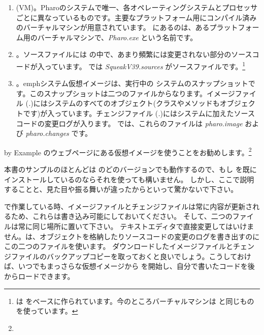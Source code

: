 \documentclass[a4paper,10pt,twoside]{book}
\begin{document}
\begin{enumerate}

  \item {} (VM)。Pharoのシステムで唯一、各オペレーティングシステムとプロセッサごとに異なっているものです。主要なプラットフォーム用にコンパイル済みのバーチャルマシンが用意されています。 にあるのは、あるプラットフォーム用のバーチャルマシンで、\textit{Pharo.exe} という名前です。

  \item {}。ソースファイルには \pharo の中で、あまり頻繁には変更されない部分のソースコードが入っています。 では \emph{SqueakV39.sources} がソースファイルです。\footnote{\pharo は  をベースに作られています。今のところバーチャルマシンは \squeak と同じものを使っています。}

  \item {}。emph{システム仮想イメージ}は、実行中の \pharo システムのスナップショットです。このスナップショットは二つのファイルからなります。イメージファイル (\emph{.})にはシステムのすべてのオブジェクト(クラスやメソッドもオブジェクトです)が入っています。チェンジファイル (\emph{.})にはシステムに加えたソースコードの変更ログが入ります。
 では、これらのファイルは \emph{pharo.image} および \emph{pharo.changes} です。
\end{enumerate}

\pharo by Example のウェブページにある仮想イメージを使うことをお勧めします。\footnote{\pbe}

本書のサンプルのほとんどは \pharo のどのバージョンでも動作するので、もし \pharo を既にインストールしているのならそれを使っても構いません。
しかし、ここで説明することと、見た目や振る舞いが違ったからといって驚かないで下さい。

\pharo で作業している時、イメージファイルとチェンジファイルは常に内容が更新されるため、これらは書き込み可能にしておいてください。
そして、二つのファイルは常に同じ場所に置いて下さい。
テキストエディタで直接変更してはいけません。\pharo は、オブジェクトを格納したりソースコードの変更のログを書き出すのにこの二つのファイルを使います。
ダウンロードしたイメージファイルとチェンジファイルのバックアップコピーを取っておくと良いでしょう。こうしておけば、いつでもまっさらな仮想イメージから \pharo を開始し、自分で書いたコードを後からロードできます。
\end{document}
